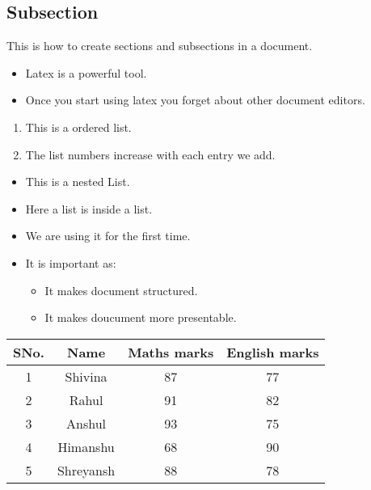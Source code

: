 \documentclass{article}
\begin{document}
\subsection{Subsection}This is how to create sections and subsections in a document.
\begin{itemize}
\item Latex is a powerful tool.
\item Once you start using latex you forget about other document editors.
\end{itemize}
\begin{enumerate}
\item This is a ordered list.
\item The list numbers increase with each entry we add.
\end{enumerate}
\begin{itemize}
\item This is a nested List.
\item Here a list is inside a list.
\item We are using it for the first time.
\item It is important as:
\begin{itemize}
\item It makes document structured.
\item It makes doucument more presentable.
\end{itemize}
\end{itemize}
\begin{center}
\begin{tabular}{||c c c c||} 
\hline
SNo. & Name & Maths marks & English marks \\ [0.75ex] 
\hline\hline
1 & Shivina & 87 & 77 \\ 
\hline
2 & Rahul & 91 & 82 \\
\hline
3 & Anshul & 93 & 75 \\
\hline
4 & Himanshu & 68 & 90 \\
\hline
5 & Shreyansh & 88 & 78 \\ [1ex] 
\hline
\end{tabular}
\end{center}
\end{document}
